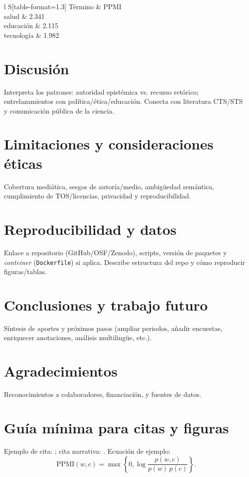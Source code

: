 \documentclass[11pt,a4paper]{article}
\begin{document}
	\begin{table}[ht]
		\centering
		\caption{Top-15 coocurrencias de \emph{ciencia} (PPMI), normalizadas por 1{,}000 palabras.}
		\label{tab:coocs}
		\begin{tabular}{l S[table-format=1.3]}
			\toprule
			Término & {PPMI} \\
			\midrule
			salud & 2.341 \\
			educación & 2.115 \\
			tecnología & 1.982 \\
			\bottomrule
		\end{tabular}
	\end{table}
	
	\section{Discusión}
	Interpreta los patrones: autoridad epistémica vs. recurso retórico; entrelazamientos con política/ética/educación. Conecta con literatura CTS/STS y comunicación pública de la ciencia.
	
	\section{Limitaciones y consideraciones éticas}
	Cobertura mediática, sesgos de autoría/medio, ambigüedad semántica, cumplimiento de TOS/licencias, privacidad y reproducibilidad.
	
	\section{Reproducibilidad y datos}
	Enlace a repositorio (GitHub/OSF/Zenodo), scripts, versión de paquetes y \emph{conteiner} (\texttt{Dockerfile}) si aplica. 
	Describe estructura del repo y cómo reproducir figuras/tablas.
	
	\section{Conclusiones y trabajo futuro}
	Síntesis de aportes y próximos pasos (ampliar periodos, añadir encuestas, enriquecer anotaciones, análisis multilingüe, etc.).
	
	\section*{Agradecimientos}
	Reconocimientos a colaboradores, financiación, y fuentes de datos.
	
	
	\appendix
	\section{Guía mínima para citas y figuras}
	Ejemplo de cita: \citep{BIBkey1}; cita narrativa: \citet{BIBkey2}.
	Ecuación de ejemplo:
	\begin{equation}
	\text{PPMI}(w,c) = \max\left\{0, \log \frac{p(w,c)}{p(w)\,p(c)}\right\}.
	\end{equation}
	
\end{document}

